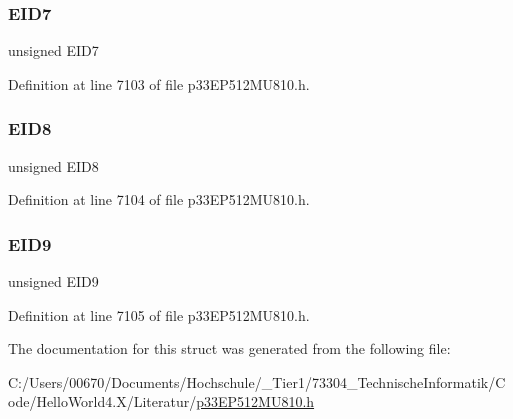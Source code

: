 \subsubsection{\texorpdfstring{E\+I\+D7}{EID7}}
{\footnotesize\ttfamily unsigned E\+I\+D7}



Definition at line 7103 of file p33\+E\+P512\+M\+U810.\+h.

\mbox{\label{structtag_c2_r_x_f15_e_i_d_b_i_t_s_acca25e0b7d86eb499d01f85222baea87}} 
\subsubsection{\texorpdfstring{E\+I\+D8}{EID8}}
{\footnotesize\ttfamily unsigned E\+I\+D8}



Definition at line 7104 of file p33\+E\+P512\+M\+U810.\+h.

\mbox{\label{structtag_c2_r_x_f15_e_i_d_b_i_t_s_ac6748f73d4ada8538b06548be4f396c2}} 
\subsubsection{\texorpdfstring{E\+I\+D9}{EID9}}
{\footnotesize\ttfamily unsigned E\+I\+D9}



Definition at line 7105 of file p33\+E\+P512\+M\+U810.\+h.



The documentation for this struct was generated from the following file\+:\begin{DoxyCompactItemize}
\item 
C\+:/\+Users/00670/\+Documents/\+Hochschule/\+\_\+\+Tier1/73304\+\_\+\+Technische\+Informatik/\+Code/\+Hello\+World4.\+X/\+Literatur/\hyperlink{p33_e_p512_m_u810_8h}{p33\+E\+P512\+M\+U810.\+h}\end{DoxyCompactItemize}
